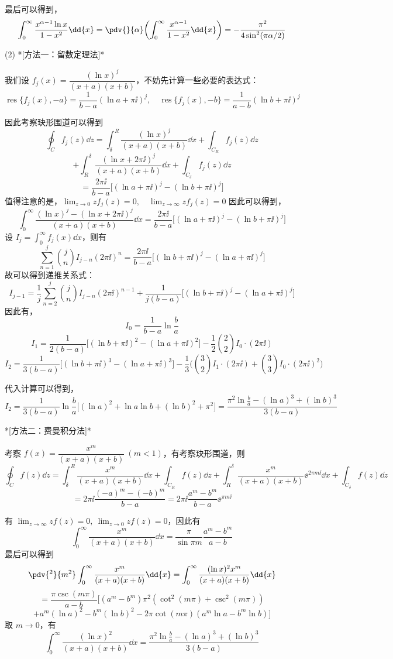 \begin{question}
\begin{solution}
最后可以得到，\[ \int_0^\infty \frac{x^{\alpha-1} \ln x}{1-x^2}\dd{x} = \pdv{}{\alpha} \biggl(\int_0^\infty \frac{x^{\alpha-1}}{1-x^2}\dd{x}\biggr)=-\frac{\pi^2}{4\sin^2(\pi\alpha/2)} \]

(2) *[方法一：留数定理法]*

我们设 \(f_j (x)= \dfrac{(\ln x)^j}{(x+a)(x+b)}\)，不妨先计算一些必要的表达式：\[ \operatorname{res}\{f_j (x),-a\}=\frac{1}{b-a} (\ln a+\pi\ii)^j,\quad \operatorname{res}\{f_j (x),-b\}=\frac{1}{a-b} (\ln b + \pi\ii)^j \]

因此考察玦形围道可以得到 \[ \oint_C f_j (z)\dd{z} = \int_\delta^R \frac{(\ln x)^j}{(x+a)(x+b)}\dd{x}+ \int_{C_R} f_j (z)\dd{z} \] \[ +\int_R^\delta \frac{(\ln x + 2\pi\ii)^j}{(x+a)(x+b)}\dd{x}+\int_{C_\delta} f_j (z)\dd{z} \] \[ =\frac{2\pi\ii}{b-a} \bigl[(\ln a + \pi\ii)^j-(\ln b + \pi\ii)^j\bigr] \]
值得注意的是，\(\displaystyle\lim_{z\to0} z f_j (z)=0,\quad \lim_{z\to\infty} z f_j (z)=0\)
因此可以得到，\[ \int_0^\infty \frac{(\ln x)^j-(\ln x+2\pi\ii)^j}{(x+a)(x+b)}\dd{x}= \frac{2\pi\ii}{b-a}\bigl[(\ln a+\pi\ii)^j - (\ln b + \pi\ii)^j\bigr] \]
设 \(I_j=\displaystyle\int_0^\infty f_j (x)\dd{x}\)，则有 \[ \sum_{n=1}^j \binom{j}{n} I_{j-n} (2\pi\ii)^n = \frac{2\pi\ii}{b-a}\bigl[(\ln b + \pi\ii)^j - (\ln a + \pi\ii)^j\bigr] \]
故可以得到递推关系式：
\[ I_{j-1} = \frac1j \sum_{n=2}^j \binom{j}{n} I_{j-n} (2\pi\ii)^{n-1} + \frac1{j(b-a)}\bigl[(\ln b+\pi\ii)^j - (\ln a+\pi\ii)^j\bigr] \]
因此有，\[ I_0 = \frac{1}{b-a} \ln\frac{b}{a} \] \[ I_1 =\frac{1}{2(b-a)}\bigl[(\ln b + \pi\ii)^2-(\ln a+\pi\ii)^2\bigr] -\frac12\binom{2}{2}I_0\cdot (2\pi\ii) \] \[ I_2 = \frac{1}{3(b-a)} \bigl[(\ln b + \pi\ii)^3-(\ln a + \pi\ii)^3\bigr] - \frac13 \bigl(\binom{3}{2} I_1\cdot (2\pi\ii) + \binom{3}{3} I_0\cdot (2\pi\ii)^2\bigr) \]

代入计算可以得到，
\[ I_2=\frac{1}{3(b-a)} \ln\frac{b}{a} \bigl[(\ln a)^2+\ln a\ln b + (\ln b)^2 +\pi^2\bigr]=\frac{\pi^2 \ln\frac{b}{a}-(\ln a)^3+(\ln b)^3}{3(b-a)} \]

*[方法二：费曼积分法]*

考察 \(f(x)= \dfrac{x^m}{(x+a)(x+b)}\ (m<1)\)，有考察玦形围道，则 \[ \oint_C f(z)\dd{z}=\int_\delta^R \frac{x^m}{(x+a)(x+b)}\dd{x}+\int_{C_R} f(z)\dd{z} + \int_R^\delta \frac{x^m}{(x+a)(x+b)} \ee^{2\pi m\ii}\dd{x}+\int_{C_\delta} f(z)\dd{z} \] \[ =2\pi\ii \frac{(-a)^m-(-b)^m}{b-a} = 2\pi\ii \frac{a^m - b^m}{b-a} \ee^{\pi m\ii} \]

有 \(\displaystyle\lim_{z\to\infty} z f(z)=0,\ \lim_{z\to0} z f(z)=0\)，因此有 \[ \int_0^\infty \frac{x^m}{(x+a)(x+b)}\dd{x}=\frac{\pi}{\sin\pi m} \frac{a^m-b^m}{a-b} \]
最后可以得到 \[ \pdv{^2}{m^2}\int_0^\infty \frac{x^m}{(x+a)(x+b)}\dd{x}=\int_0^\infty \frac{(\ln x)^2 x^m}{(x+a)(x+b)}\dd{x} \] \[ =\frac{\pi\csc(m\pi)}{a-b} \biggl[(a^m - b^m) \pi^2 (\cot^2(m\pi) + \csc^2(m\pi)) \] \[ + a^m (\ln a)^2 - b^m (\ln b)^2 - 2\pi\cot(m\pi) (a^m \ln a - b^m \ln b)\biggr] \]
取 \(m\to0\)，有 \[ \int_0^\infty \frac{(\ln x)^2}{(x+a)(x+b)}\dd{x}=\frac{\pi^2 \ln\frac{b}{a}-(\ln a)^3+(\ln b)^3}{3(b-a)} \]


\end{solution}
\end{question}
